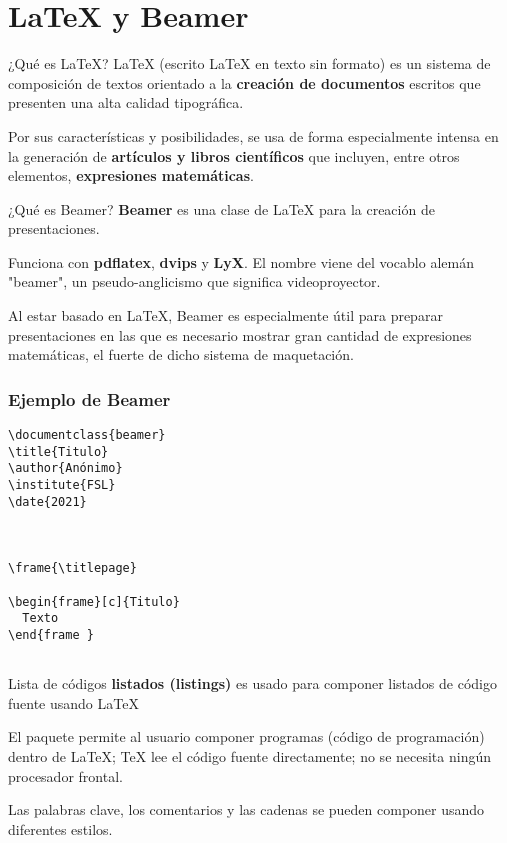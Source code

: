 
\section{\LaTeX{} y Beamer}

\begin{frame}[c]{¿Qué es \LaTeX{}?}
  \LaTeX{} (escrito LaTeX en texto sin formato) es un sistema de composición
  de textos orientado a la \textbf{creación de documentos} escritos que
  presenten una alta calidad tipográfica.

  \vspace{\baselineskip}
  Por sus características y posibilidades, se usa de forma especialmente
  intensa en la generación de \textbf{artículos y libros científicos} que
  incluyen, entre otros elementos, \textbf{expresiones matemáticas}.
\end{frame}

\begin{frame}[c]{¿Qué es Beamer?}
  \textbf{Beamer} es una clase de LaTeX para la creación de presentaciones.

  \vspace{\baselineskip}
  Funciona con \textbf{pdflatex}, \textbf{dvips} y \textbf{LyX}.
  El nombre viene del vocablo alemán "beamer", un pseudo-anglicismo que
  significa videoproyector.

  \vspace{\baselineskip}
  Al estar basado en LaTeX, Beamer es especialmente útil para preparar
  presentaciones en las que es necesario mostrar gran cantidad de expresiones
  matemáticas, el fuerte de dicho sistema de maquetación.
\end{frame}

\begin{frame}[fragile]
  \frametitle{Ejemplo de Beamer}
  \begin{lstlisting}[language={[LaTeX]TeX}]
\documentclass{beamer}
\title{Titulo}
\author{Anónimo}
\institute{FSL}
\date{2021}



\frame{\titlepage}

\begin{frame}[c]{Titulo}
  Texto
\end{frame }


  \end{lstlisting}
\end{frame}


\begin{frame}[c]{Lista de códigos}
  \textbf{listados (listings)} es usado para componer listados de código
  fuente usando LaTeX

  \vspace{\baselineskip}
  El paquete permite al usuario componer programas (código de programación)
  dentro de LaTeX; TeX lee el código fuente directamente; no se necesita
  ningún procesador frontal.

  \vspace{\baselineskip}
  Las palabras clave, los comentarios y las cadenas se pueden componer
  usando diferentes estilos.
\end{frame}


